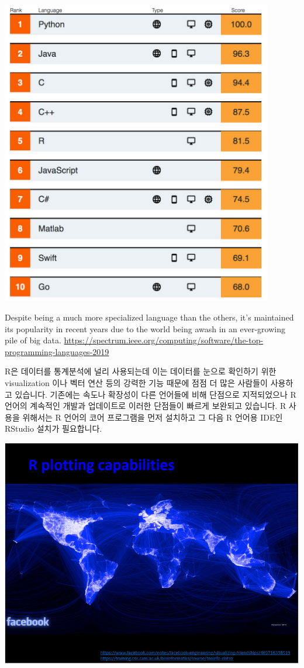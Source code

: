 \documentclass[
]{book}
\begin{document}
\includegraphics[width=4.6875in,height=\textheight]{images/01/topproglang.jpeg}

Despite being a much more specialized language than the others, it's maintained its popularity in recent years due to the world being awash in an ever-growing pile of big data.
\url{https://spectrum.ieee.org/computing/software/the-top-programming-languages-2019}

R은 데이터를 통계분석에 널리 사용되는데 이는 데이터를 눈으로 확인하기 위한 visualization 이나 벡터 연산 등의 강력한 기능 때문에 점점 더 많은 사람들이 사용하고 있습니다. 기존에는 속도나 확장성이 다른 언어들에 비해 단점으로 지적되었으나 R 언어의 계속적인 개발과 업데이트로 이러한 단점들이 빠르게 보완되고 있습니다. R 사용을 위해서는 R 언어의 코어 프로그램을 먼저 설치하고 그 다음 R 언어용 IDE인 RStudio 설치가 필요합니다.

\includegraphics{images/01/22.PNG}
\end{document}
